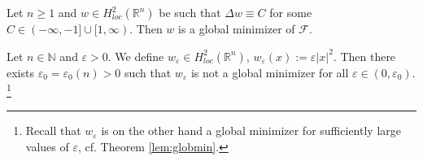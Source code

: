 \documentclass[10pt,a4paper]{amsart}
\begin{document}
\begin{theorem}\label{lem:globmin}
    Let $n \geq 1$ and $w \in H^2_{loc}(\mathbb{R}^n)$ be such that $\Delta w \equiv C$ for some $C \in (-\infty,-1] \cup [1, \infty)$. Then $w$ is a global minimizer of $\mathcal{F}$. 
\end{theorem}

\begin{lemma} \label{lem:lemma8}
    Let $n \in \mathbb{N}$ and  $\varepsilon> 0$.
    We define  $w_{\varepsilon}\in H^2_{loc}(\mathbb{R}^n)$, $w_{\varepsilon}(x) := \varepsilon |x|^2$. Then there exists $\varepsilon_0 = \varepsilon_0(n) > 0$ such that  $w_\varepsilon$ is not a global minimizer for all $\varepsilon \in (0, \varepsilon_0)$.%
    \footnote{Recall that $w_\varepsilon$ is on the other hand  a global minimizer for sufficiently large values of $\varepsilon$, cf. Theorem \ref{lem:globmin}.} 
\end{lemma}
\end{document}
